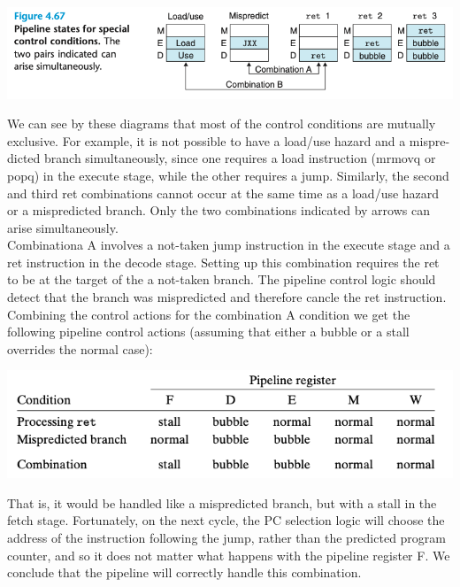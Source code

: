 \documentclass[11pt]{article}
\begin{document}
\begin{enumerate}
\begin{center}
\includegraphics[width=.9\linewidth]{pics/figure4.67-pipeline-states-for-special-control-conditions.png}
\end{center}

We can see by these diagrams that most of the control conditions are mutually exclusive. For example, it is not possible to have a load/use hazard and a mispre- dicted branch simultaneously, since one requires a load instruction (mrmovq or popq) in the execute stage, while the other requires a jump. Similarly, the second and third ret combinations cannot occur at the same time as a load/use hazard or a mispredicted branch. Only the two combinations indicated by arrows can arise simultaneously.\\

Combinationa A involves a not-taken jump instruction in the execute stage and a ret instruction in the decode stage. Setting up this combination requires the ret to be at the target of the a not-taken branch. The pipeline control logic should detect that the branch was mispredicted and therefore cancle the ret instruction.\\

Combining the control actions for the combination A condition we get the following pipeline control actions (assuming that either a bubble or a stall overrides the normal case):\\

\begin{center}
\includegraphics[width=.9\linewidth]{pics/combinatiion-a.png}
\end{center}

That is, it would be handled like a mispredicted branch, but with a stall in the fetch stage. Fortunately, on the next cycle, the PC selection logic will choose the address of the instruction following the jump, rather than the predicted program counter, and so it does not matter what happens with the pipeline register F. We conclude that the pipeline will correctly handle this combination.\\



\end{enumerate}
\end{document}
